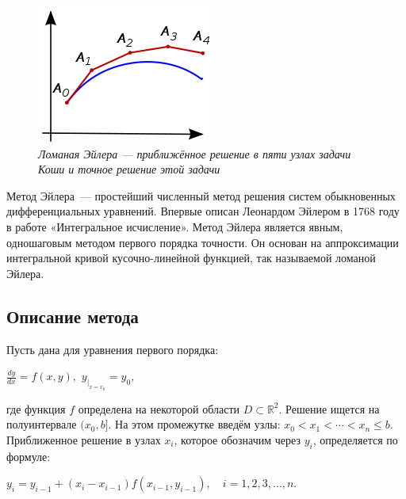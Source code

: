 \documentclass[a4paper]{article}
\begin{document}
{{{{{{{{\begin{figure}
\includegraphics[width=0.9\linewidth]{images/Euler_method.png}
\caption{\textit{Ломаная Эйлера — приближённое решение в пяти узлах задачи Коши и точное решение этой задачи}}
\label{fig:wrapfig}
\end{figure}

Метод Эйлера~--- простейший численный метод решения систем обыкновенных дифференциальных уравнений. Впервые описан Леонардом Эйлером в 1768 году в работе «Интегральное исчисление». Метод Эйлера является явным, одношаговым методом первого порядка точности. Он основан на аппроксимации интегральной кривой кусочно-линейной функцией, так называемой ломаной Эйлера.

\subsection{Описание метода}

Пусть дана для уравнения первого порядка:
\begin{center}
    {{\(\frac{dy}{dx} = f(x,y),\)}}
    {{\(y_{|_{x = x_{0}}} = y_{0},\)}}
\end{center}

где функция {{\(f\)}} определена на некоторой области
{{\(D \subset \mathbb{R}^{2}\)}}. Решение ищется на полуинтервале
{{\((x_{0},b\rbrack\)}}. На этом промежутке введём узлы:
{{\(x_{0} < x_{1} < \cdots < x_{n} \leq b.\)}} Приближенное решение в
узлах {{\(x_{i}\)}}, которое обозначим через {{\(y_{i}\)}}, определяется
по формуле:

\begin{center}
 {{\(y_{i} = y_{i - 1} + (x_{i} - x_{i - 1})f(x_{i - 1},y_{i - 1}),\quad i = 1,2,3,\ldots,n.\)}}
\end{center}

}}}}}}}}
\end{document}
